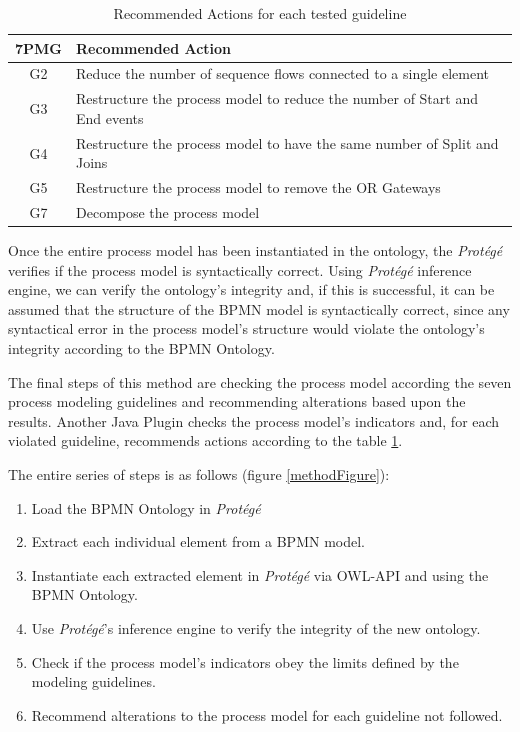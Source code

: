 \documentclass[a4paper,twoside]{article}
\begin{document}
\begin{table}[]
	\centering
	\caption{Recommended Actions for each tested guideline}
	\label{RecommendedActions}
	\begin{tabular}{|c|p{5.5cm}|}
		\hline
		7PMG & Recommended Action \\ \hline
		G2 & Reduce the number of sequence flows connected to a single element \\ \hline
		G3 & Restructure the process model to reduce the number of Start and End events \\ \hline
		G4 & Restructure the process model to have the same number of Split and Joins \\ \hline
		G5 & Restructure the process model to remove the OR Gateways \\ \hline
		G7 & Decompose the process model \\ \hline
	\end{tabular}
\end{table}

Once the entire process model has been instantiated in the ontology, the \textit{Protégé}  verifies if the process model is syntactically correct.  Using \textit{Protégé} inference engine, we can verify the ontology's integrity and, if this is successful, it can be assumed that the structure of the BPMN model is syntactically correct, since any syntactical error in the process model's structure would violate the ontology's integrity according to the BPMN Ontology.

The final steps of this method are checking the process model according the seven process modeling guidelines and recommending alterations based upon the results. Another Java Plugin checks the process model's indicators and, for each violated guideline, recommends actions according to the table \ref{RecommendedActions}.

The entire series of steps is as follows (figure \ref{methodFigure}):

\begin{enumerate}
	\item Load the BPMN Ontology in \textit{Protégé}
	\item Extract each individual element from a BPMN model.
	\item Instantiate each extracted element in \textit{Protégé} via OWL-API and using the BPMN Ontology.
	\item Use \textit{Protégé}'s inference engine to verify the integrity of the new ontology.
	\item Check if the process model's indicators obey the limits defined by the modeling guidelines.
	\item Recommend alterations to the process model for each guideline not followed.
\end{enumerate}
\end{document}
